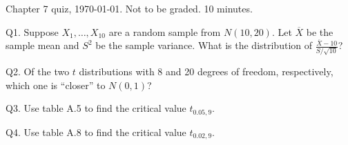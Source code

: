 \documentclass[12pt]{article}
\begin{document}
\thispagestyle{empty}

Chapter 7 quiz, \today. Not to be graded. 10 minutes.
\bigskip

Q1.
Suppose $X_1,\dotsc,X_10$ are a random sample from
$N(10, 20)$.
Let $\overline{X}$ be the sample mean
and $S^2$ be the sample variance.
What is the distribution of $\frac{\overline{X} - 10}{S/\sqrt{10}}$?

\vskip2in

Q2.
Of the two $t$ distributions with 8 and 20 degrees of freedom,
respectively, which one is ``closer'' to $N(0,1)$?

\vskip2in

Q3.
Use table A.5 to find the critical value $t_{0.05, 9}$.

\vskip2in

Q4.
Use table A.8 to find the critical value $t_{0.02, 9}$.
\end{document}
